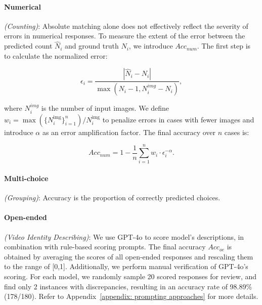 

\paragraph{Numerical} \textit{(Counting)}: Absolute matching alone does not effectively reflect the severity of errors in numerical responses. To measure the extent of the error between the predicted count \( \hat{N}_i \) and ground truth \( N_i \), we introduce \(Acc_{num}\). The first step is to calculate the normalized error:

\begin{equation}
\epsilon_i = \frac{\left| \hat{N}_i - N_{i} \right|}{\max\left(N_{i} - 1, N^{img}_i - N_i\right)},
\end{equation}

\noindent where \( N^{img}_i \) is the number of input images. We define \( w_i = \max (\{N^{\text{img}}_i\}_{i=1}^n )/{N^{\text{img}}_i} \) to penalize errors in cases with fewer images and introduce \( \alpha \) as an error amplification factor. The final accuracy over \( n \) cases is:

\begin{equation}
Acc_{num} = 1 - \frac{1}{n} \sum_{i=1}^{n} w_i \cdot \epsilon_i^{-\alpha}.
\end{equation}




\paragraph{Multi-choice} \textit{(Grouping)}: Accuracy is the proportion of correctly predicted choices.    


\paragraph{Open-ended} \textit{(Video Identity Describing)}: We use GPT-4o to score model's descriptions, in combination with rule-based scoring prompts. The final accuracy \(Acc_{oe}\) is obtained by averaging the scores of all open-ended responses and rescaling them to the range of [0,1]. Additionally, we perform manual verification of GPT-4o’s scoring. For each model, we randomly sample 20 scored responses for review, and find only 2 instances with discrepancies, resulting in an accuracy rate of 98.89\% (178/180). Refer to Appendix~\ref{appendix: prompting approaches} for more details.


